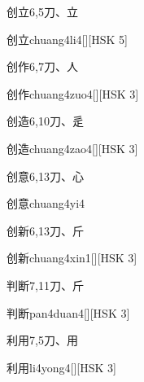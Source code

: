 \begin{entry}{创立}{6,5}{⼑、⽴}
  \begin{phonetics}{创立}{chuang4li4}[][HSK 5]
  \end{phonetics}
\end{entry}

\begin{entry}{创作}{6,7}{⼑、⼈}
  \begin{phonetics}{创作}{chuang4zuo4}[][HSK 3]
  \end{phonetics}
\end{entry}

\begin{entry}{创造}{6,10}{⼑、⾡}
  \begin{phonetics}{创造}{chuang4zao4}[][HSK 3]
  \end{phonetics}
\end{entry}

\begin{entry}{创意}{6,13}{⼑、⼼}
  \begin{phonetics}{创意}{chuang4yi4}
  \end{phonetics}
\end{entry}

\begin{entry}{创新}{6,13}{⼑、⽄}
  \begin{phonetics}{创新}{chuang4xin1}[][HSK 3]
  \end{phonetics}
\end{entry}

\begin{entry}{判断}{7,11}{⼑、⽄}
  \begin{phonetics}{判断}{pan4duan4}[][HSK 3]
  \end{phonetics}
\end{entry}

\begin{entry}{利用}{7,5}{⼑、⽤}
  \begin{phonetics}{利用}{li4yong4}[][HSK 3]
  \end{phonetics}
\end{entry}

